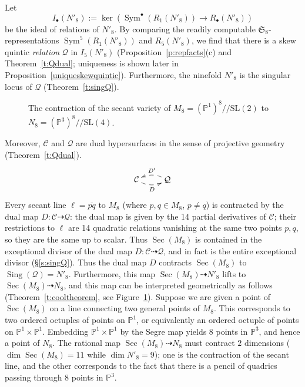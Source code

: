 \documentclass{amsart}
\theoremstyle{definition}
\theoremstyle{remark}
\DeclareMathOperator{\Sing}{Sing}
\DeclareMathOperator{\Sym}{Sym}
\DeclareMathOperator{\Sec}{Sec}
\def\SL{\mathrm{SL}}
\def\SS{\mathfrak{S}}
\def\proj{\mathbb{P}}
\def\cq{/\!/}
\def\cubic{\mathcal{C}}
\def\quintic{\mathcal{Q}}
\begin{document}
Let
\begin{displaymath}
I_{\bullet}(N'_8) := \ker \left( \Sym^{\bullet}(R_1(N'_8)) \to R_{\bullet}(N'_8) \right)
\end{displaymath}
be the ideal of relations of $N'_8$.  By comparing the readily computable $\SS_8$-representations $\Sym^5(R_1(N'_8))$
and $R_5(N'_8)$, we find that there is a skew quintic {\em relation} $\quintic$ in $I_5(N'_8)$
(Proposition~\ref{p:repfacts}(c) and  Theorem~\ref{t:Qdual}; uniqueness
is shown later in Proposition~\ref{uniqueskewquintic}).  Furthermore, the ninefold $N'_8$ is the singular locus of
$\quintic$ (Theorem~\ref{t:singQ}).

\begin{figure}[ht]
\begin{center}

\end{center}
\caption{The contraction of the secant variety of $M_8= (\proj^1)^8 \cq
  \SL(2) $ to $N_8 = (\proj^3)^8 \cq \SL(4)$.}
\label{f:paris}
\end{figure}

Moreover, $\cubic$ and $\quintic$ are dual hypersurfaces in the sense of projective geometry (Theorem~\ref{t:Qdual}).
\begin{displaymath}
\xymatrix{
\cubic \ar@/_/@{-->}[r]_D &
\quintic \ar@/_/@{-->}[l]_{D'} }
\end{displaymath}
Every secant line $\ell = \overline{pq}$ to $M_8$ (where $p,q \in
M_8$, $p \neq q$) is contracted by the dual map $D: \cubic
\dashrightarrow \quintic$: the dual map is given by the 14 partial derivatives of $\cubic$; their restrictions to
$\ell$ are 14 quadratic relations vanishing at the same two points $p, q$, so they are the same up to scalar.  Thus
$\Sec(M_8)$ is contained in the exceptional divisor of the dual map $D: \cubic \dashrightarrow \quintic$, and in fact
is the entire exceptional divisor (\S \ref{s:singQ}).  Thus the dual map $D$ contracts $\Sec(M_8)$ to $\Sing(\quintic)
= N'_8$.  Furthermore, this map $\Sec(M_8) \dashrightarrow N'_8$ lifts to $\Sec(M_8) \dashrightarrow N_8$, and this
map can be interpreted geometrically as follows (Theorem~\ref{t:cooltheorem}, see Figure~\ref{f:paris}).  Suppose we are
given a point of $\Sec(M_8)$ on a line connecting two general points of $M_8$.  This corresponds to two ordered
octuples of points on $\proj^1$, or equivalently an ordered octuple of points on $\proj^1 \times \proj^1$.  Embedding
$\proj^1 \times \proj^1$ by the Segre map yields $8$ points in $\proj^3$, and hence a point of $N_8$.  The rational map
$\Sec(M_8) \dashrightarrow N_8$ must contract $2$ dimensions ($\dim \Sec(M_8) = 11$ while $\dim N'_8 = 9$); one is
the contraction of the secant line, and the other corresponds to the fact that there is a pencil of quadrics passing
through $8$ points in $\proj^3$.
\end{document}
